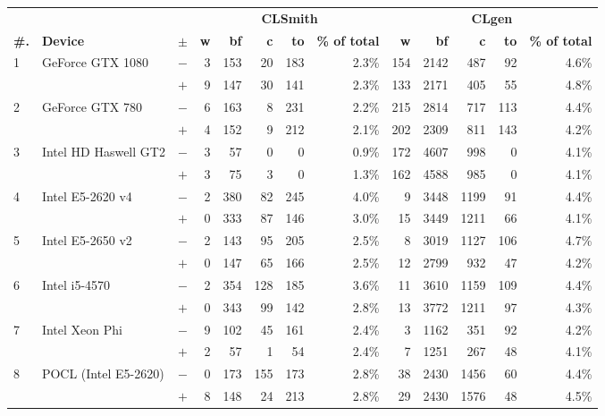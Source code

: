   \begin{tabular}{lll | rrrrr | rrrrr }
  \toprule
  & & & \multicolumn{5}{c|}{\textbf{CLSmith}} & \multicolumn{5}{c}{\textbf{CLgen}} \\
  \textbf{\#.} & \textbf{Device} & $\pm$ &
  \textbf{w} & \textbf{bf} & \textbf{c} & \textbf{to} & \textbf{\% of total} &
  \textbf{w} & \textbf{bf} & \textbf{c} & \textbf{to} & \textbf{\% of total} \\
  \midrule
  \multirow{ 2}{*}{1} & \multirow{ 2}{*}{GeForce GTX 1080} & $-$ & 3 & 153 & 20 & 183 & 2.3\%       & 154 & 2142 & 487 & 92 & 4.6\% \\& & $+$ & 9 & 147 & 30 & 141 & 2.3\% & 133 & 2171 & 405 & 55 & 4.8\% \\
\hline
\multirow{ 2}{*}{2} & \multirow{ 2}{*}{GeForce GTX 780} & $-$ & 6 & 163 & 8 & 231 & 2.2\%       & 215 & 2814 & 717 & 113 & 4.4\% \\& & $+$ & 4 & 152 & 9 & 212 & 2.1\% & 202 & 2309 & 811 & 143 & 4.2\% \\
\hline
\multirow{ 2}{*}{3} & \multirow{ 2}{*}{Intel HD Haswell GT2} & $-$ & 3 & 57 & 0 & 0 & 0.9\%       & 172 & 4607 & 998 & 0 & 4.1\% \\& & $+$ & 3 & 75 & 3 & 0 & 1.3\% & 162 & 4588 & 985 & 0 & 4.1\% \\
\hline
\multirow{ 2}{*}{4} & \multirow{ 2}{*}{Intel E5-2620 v4} & $-$ & 2 & 380 & 82 & 245 & 4.0\%       & 9 & 3448 & 1199 & 91 & 4.4\% \\& & $+$ & 0 & 333 & 87 & 146 & 3.0\% & 15 & 3449 & 1211 & 66 & 4.1\% \\
\hline
\multirow{ 2}{*}{5} & \multirow{ 2}{*}{Intel E5-2650 v2} & $-$ & 2 & 143 & 95 & 205 & 2.5\%       & 8 & 3019 & 1127 & 106 & 4.7\% \\& & $+$ & 0 & 147 & 65 & 166 & 2.5\% & 12 & 2799 & 932 & 47 & 4.2\% \\
\hline
\multirow{ 2}{*}{6} & \multirow{ 2}{*}{Intel i5-4570} & $-$ & 2 & 354 & 128 & 185 & 3.6\%       & 11 & 3610 & 1159 & 109 & 4.4\% \\& & $+$ & 0 & 343 & 99 & 142 & 2.8\% & 13 & 3772 & 1211 & 97 & 4.3\% \\
\hline
\multirow{ 2}{*}{7} & \multirow{ 2}{*}{Intel Xeon Phi} & $-$ & 9 & 102 & 45 & 161 & 2.4\%       & 3 & 1162 & 351 & 92 & 4.2\% \\& & $+$ & 2 & 57 & 1 & 54 & 2.4\% & 7 & 1251 & 267 & 48 & 4.1\% \\
\hline
\multirow{ 2}{*}{8} & \multirow{ 2}{*}{POCL (Intel E5-2620)} & $-$ & 0 & 173 & 155 & 173 & 2.8\%       & 38 & 2430 & 1456 & 60 & 4.4\% \\& & $+$ & 8 & 148 & 24 & 213 & 2.8\% & 29 & 2430 & 1576 & 48 & 4.5\% \\

\end{tabular}
